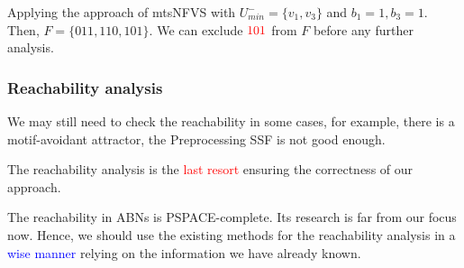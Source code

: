 \documentclass{beamer}              %
\newcommand{\blue}[1]{\textcolor{blue}{#1}}
\newcommand{\red}[1]{\textcolor{red}{#1}}
\begin{document}
\begin{frame}
{\hspace{0.8cm}

Applying the approach of mtsNFVS with \(U^-_{min} = \{v_1, v_3\}\) and \(b_1 = 1, b_3 = 1\).
Then, \(F = \{011, 110, 101\}\).
We can exclude \(\red{101}\) from \(F\) before any further analysis.
}

\end{frame}

\begin{frame}
\frametitle{Reachability analysis}

We may still need to check the reachability in some cases, for example, there is a motif-avoidant attractor, the Preprocessing SSF is not good enough.

\hspace{0.8cm}

The reachability analysis is the \red{last resort} ensuring the correctness of our approach.

\hspace{0.8cm}

The reachability in ABNs is PSPACE-complete.
Its research is far from our focus now.
Hence, we should use the existing methods for the reachability analysis in a \blue{wise manner} relying on the information we have already known.

\end{frame}
\end{document}
